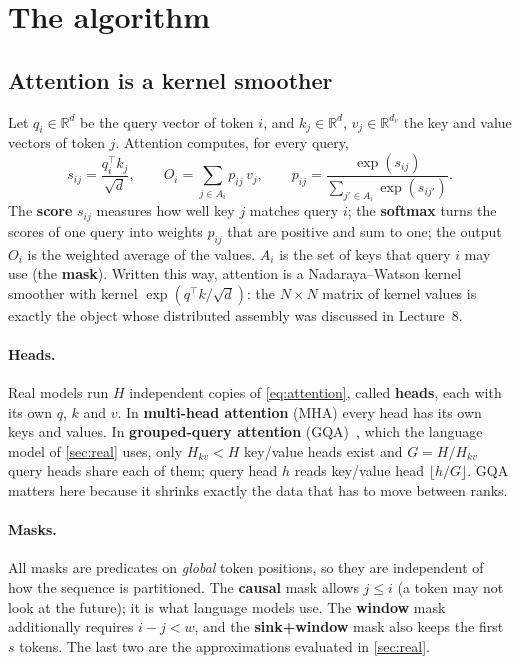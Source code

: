 \documentclass[10pt,a4paper]{article}
\newcommand{\term}[1]{\textbf{#1}}
\newcommand{\R}{\mathbb{R}}
\begin{document}


\section{The algorithm}\label{sec:algorithm}

\subsection{Attention is a kernel smoother}
Let $q_i\in\R^d$ be the query vector of token $i$, and $k_j\in\R^d$, $v_j\in\R^{d_v}$
the key and value vectors of token $j$. Attention computes, for every query,
\begin{equation}
 s_{ij}=\frac{q_i^\top k_j}{\sqrt d},\qquad
 O_i=\sum_{j\in A_i} p_{ij}\,v_j,\qquad
 p_{ij}=\frac{\exp(s_{ij})}{\sum_{j'\in A_i}\exp(s_{ij'})} .
 \label{eq:attention}
\end{equation}
The \term{score} $s_{ij}$ measures how well key $j$ matches query $i$; the
\term{softmax} turns the scores of one query into weights $p_{ij}$ that are positive
and sum to one; the output $O_i$ is the weighted average of the values. $A_i$ is the
set of keys that query $i$ may use (the \term{mask}). Written this way, attention is a
Nadaraya--Watson kernel smoother with kernel $\exp(q^\top k/\sqrt d)$: the $N\times N$
matrix of kernel values is exactly the object whose distributed assembly was discussed
in Lecture~8.

\paragraph{Heads.} Real models run $H$ independent copies of \cref{eq:attention},
called \term{heads}, each with its own $q$, $k$ and $v$. In \term{multi-head
attention} (MHA) every head has its own keys and values. In \term{grouped-query
attention} (GQA)~\cite{gqa}, which the language model of \cref{sec:real} uses,
only $H_{kv}<H$ key/value heads exist and $G=H/H_{kv}$ query heads
share each of them; query head $h$ reads key/value head $\lfloor h/G\rfloor$. GQA
matters here because it shrinks exactly the data that has to move between ranks.

\paragraph{Masks.} All masks are predicates on \emph{global} token positions, so
they are independent of how the sequence is partitioned. The \term{causal} mask
allows $j\le i$ (a token may not look at the future); it is what language models
use. The \term{window} mask additionally requires $i-j<w$, and the
\term{sink+window} mask also keeps the first $s$ tokens. The last two are the
approximations evaluated in \cref{sec:real}.
\end{document}
